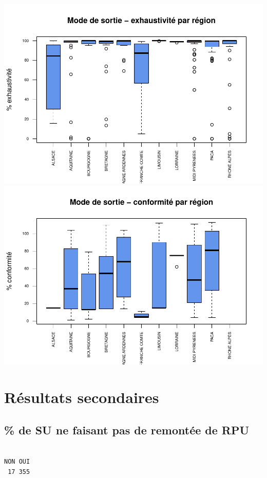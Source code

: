 \documentclass[]{article}
\begin{document}
\includegraphics{septembre2015_files/figure-latex/unnamed-chunk-37-1.pdf}
\includegraphics{septembre2015_files/figure-latex/unnamed-chunk-37-2.pdf}

\section{Résultats secondaires}\label{resultats-secondaires}

\subsection{\% de SU ne faisant pas de remontée de
RPU}\label{de-su-ne-faisant-pas-de-remontee-de-rpu}

\begin{verbatim}

NON OUI 
 17 355 
\end{verbatim}
\end{document}

